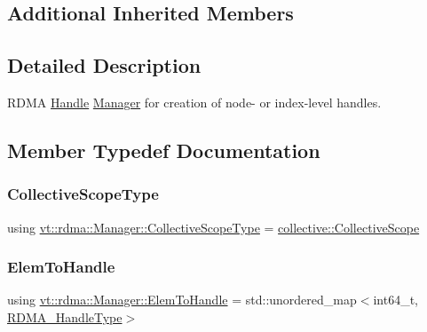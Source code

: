 \subsection*{Additional Inherited Members}


\subsection{Detailed Description}
R\+D\+MA \hyperlink{structvt_1_1rdma_1_1_handle}{Handle} \hyperlink{structvt_1_1rdma_1_1_manager}{Manager} for creation of node-\/ or index-\/level handles. 

\subsection{Member Typedef Documentation}
\mbox{\label{structvt_1_1rdma_1_1_manager_a7a5509b81547110f71aa85027520cfd5}} 
\subsubsection{\texorpdfstring{Collective\+Scope\+Type}{CollectiveScopeType}}
{\footnotesize\ttfamily using \hyperlink{structvt_1_1rdma_1_1_manager_a7a5509b81547110f71aa85027520cfd5}{vt\+::rdma\+::\+Manager\+::\+Collective\+Scope\+Type} =  \hyperlink{structvt_1_1collective_1_1_collective_scope}{collective\+::\+Collective\+Scope}}

\mbox{\label{structvt_1_1rdma_1_1_manager_ad794893058cec7595bc2bcb466ce7d3f}} 
\subsubsection{\texorpdfstring{Elem\+To\+Handle}{ElemToHandle}}
{\footnotesize\ttfamily using \hyperlink{structvt_1_1rdma_1_1_manager_ad794893058cec7595bc2bcb466ce7d3f}{vt\+::rdma\+::\+Manager\+::\+Elem\+To\+Handle} =  std\+::unordered\+\_\+map$<$int64\+\_\+t, \hyperlink{namespacevt_a10442579ec4e7ebef223818e64bcf908}{R\+D\+M\+A\+\_\+\+Handle\+Type}$>$}

